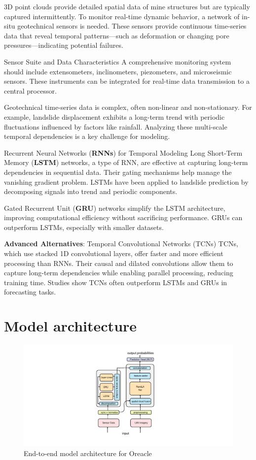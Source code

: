 \documentclass{article}
\begin{document}
3D point clouds provide detailed spatial data of mine structures but are typically captured intermittently. To monitor real-time dynamic behavior, a network of in-situ geotechnical sensors is needed. These sensors provide continuous time-series data that reveal temporal patterns—such as deformation or changing pore pressures—indicating potential failures.

Sensor Suite and Data Characteristics
A comprehensive monitoring system should include extensometers, inclinometers, piezometers, and microseismic sensors. These instruments can be integrated for real-time data transmission to a central processor.

Geotechnical time-series data is complex, often non-linear and non-stationary. For example, landslide displacement exhibits a long-term trend with periodic fluctuations influenced by factors like rainfall. Analyzing these multi-scale temporal dependencies is a key challenge for modeling.

Recurrent Neural Networks (\textbf{RNNs}) for Temporal Modeling
Long Short-Term Memory (\textbf{LSTM}) networks, a type of RNN, are effective at capturing long-term dependencies in sequential data. Their gating mechanisms help manage the vanishing gradient problem. LSTMs have been applied to landslide prediction by decomposing signals into trend and periodic components.

Gated Recurrent Unit (\textbf{GRU}) networks simplify the LSTM architecture, improving computational efficiency without sacrificing performance. GRUs can outperform LSTMs, especially with smaller datasets.

\textbf{Advanced Alternatives}: Temporal Convolutional Networks (TCNs)
TCNs, which use stacked 1D convolutional layers, offer faster and more efficient processing than RNNs. Their causal and dilated convolutions allow them to capture long-term dependencies while enabling parallel processing, reducing training time. Studies show TCNs often outperform LSTMs and GRUs in forecasting tasks.

\section{Model architecture}
\begin{figure}[h!]
	\centering
	\includegraphics[width=1\linewidth]{figures/architecture.pdf}
	\caption{End-to-end model architecture for Oreacle}
	\label{fig:fig1}
\end{figure}
\end{document}
